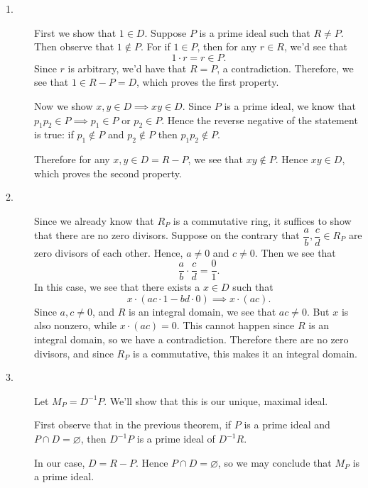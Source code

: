 \begin{prf}
    \begin{description}
        \item[1.] First we show that $1 \in D$. 
        Suppose $P$ is a prime ideal such that $R \ne P$. Then
        observe that $1 \not\in P$. For if $1 \in P$, then for any $r
        \in R$, we'd see that 
        \[
            1 \cdot r = r \in P.
        \]
        Since $r$ is arbitrary, we'd have that $R = P$, a
        contradiction. Therefore, we see that $1 \in R - P = D$, which
        proves the first property.
        
        Now we show $x, y \in D \implies xy \in D$. Since $P$ is a prime ideal, we know that
        $p_1p_2 \in P \implies p_1 \in P$ or $p_2 \in P$. Hence the reverse
        negative of the statement is true: if $p_1 \not\in P$ and $p_2
        \not\in P$ then $p_1p_2 \not\in P$. 
        
        Therefore for any $x, y
        \in D =R - P$, we see that $xy \not\in P$. Hence $xy \in D$, which
        proves the second property.

        \item[2.] Since we already know that $R_P$ is a commutative ring,
        it suffices to show that there are no zero divisors. Suppose
        on the contrary that $\dfrac{a}{b}, \dfrac{c}{d} \in R_P$ are
        zero divisors of each other. Hence, $a \ne 0$ and $c \ne 0$.
        Then we see that 
        \[
            \frac{a}{b} \cdot \frac{c}{d} = \frac{0}{1}.
        \]
        In this case, we see that there exists a $x \in D$ such that 
        \[
            x \cdot (ac \cdot 1 - bd \cdot 0) \implies x \cdot(ac).            
        \]
        Since $a, c \ne 0$, and $R$ is an integral domain, we see that
        $ac \ne 0$. But $x$ is also nonzero, while $x \cdot (ac) =
        0$. This cannot happen since $R$ is an integral domain, so we
        have a contradiction. Therefore there are no zero divisors,
        and since $R_P$ is a commutative, this makes it an integral
        domain. 

        \item[3.] Let $M_P = D^{-1}P$. We'll show that this is our unique,
        maximal ideal. 

        First observe that in the previous theorem, if $P$ is a prime
        ideal and $P \cap D = \varnothing$, then $D^{-1}P$ is a prime
        ideal of $D^{-1}R$. 
        
        In our case, $D = R - P$. Hence $P \cap D
        = \varnothing$, so we may conclude that $M_P$ is a prime
        ideal.
        

\end{description}
\end{prf}

